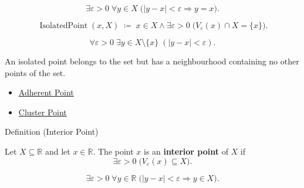 \begin{remark*}
\[
  \exists\varepsilon>0\;\forall y\in X\;\bigl(|y-x|<\varepsilon\Rightarrow y=x\bigr).
\]
\end{remark*}

\begin{remark*}
\[
  \operatorname{IsolatedPoint}(x,X)
  \;\coloneqq\;
  x\in X\wedge\exists\varepsilon>0\;\bigl(V_\varepsilon(x)\cap X=\{x\}\bigr).
\]
\end{remark*}

\begin{remark*}
\[
  \forall\varepsilon>0\;\exists y\in X\setminus\{x\}\;(|y-x|<\varepsilon).
\]
\end{remark*}

\begin{remark*}[Interpretation]
An isolated point belongs to the set but has a neighbourhood containing
no other points of the set.
\end{remark*}

\begin{dependencies}
\begin{itemize}
  \item \hyperref[def:adherent-point-r]{Adherent Point}
  \item \hyperref[def:cluster-point-r]{Cluster Point}
\end{itemize}
\end{dependencies}


\begin{definitionbox}{Definition (Interior Point)}
\begin{definition}
\label{def:interior-point-r}
Let $X\subseteq\mathbb{R}$ and let $x\in\mathbb{R}$. The point $x$ is
an \textbf{interior point} of $X$ if
\[
  \exists\varepsilon>0\;\bigl(V_\varepsilon(x)\subseteq X\bigr).
\]
\end{definition}
\end{definitionbox}

\begin{remark*}
\[
  \exists\varepsilon>0\;\forall y\in\mathbb{R}\;\bigl(|y-x|<\varepsilon\Rightarrow y\in X\bigr).
\]
\end{remark*}

